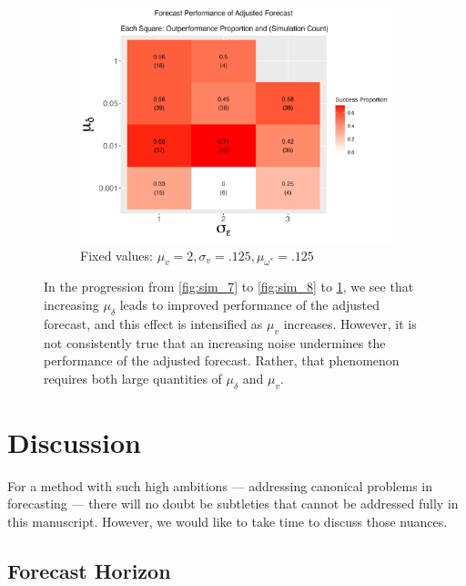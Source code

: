 \documentclass{uiucthesis2021}
\theoremstyle{definition}
\begin{document}
\begin{figure}[!h]
        \begin{subfigure}{.44\linewidth} 
          \centering
            \includegraphics[scale=.42]{simulation_plots/Nov27_160348_2024_mudelta_sigmaepsilon.png}
            \caption{Fixed values: $\mu_{v} = 2, \sigma_{v} = .125, \mu_{\omega^{*}} = .125$}\label{fig:sim_9}
        \end{subfigure}
        
            \caption{In the progression from \ref{fig:sim_7} to \ref{fig:sim_8} to \ref{fig:sim_9}, we see that increasing $\mu_{\delta}$ leads to improved performance of the adjusted forecast, and this effect is intensified as $\mu_{v}$ increases.  However, it is not consistently true that an increasing noise undermines the performance of the adjusted forecast.  Rather, that phenomenon requires both large quantities of $\mu_{\delta}$ and $\mu_{v}$.}
            \label{fig:set_of_three_three}
          \end{figure}
    \clearpage 
  
  \section{Discussion}

For a method with such high ambitions --- addressing canonical problems in forecasting --- there will no doubt be subtleties that cannot be addressed fully in this manuscript.  However, we would like to take time to discuss those nuances.
  \subsection{Forecast Horizon}
  
\end{document}
